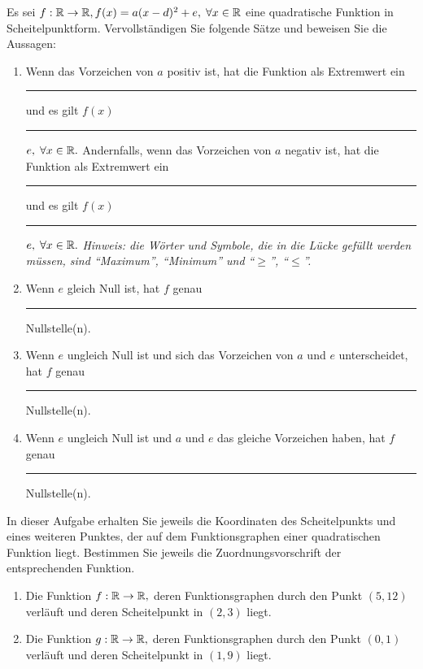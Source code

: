 \documentclass[12pt]{article}
\begin{document}
\begin{exercise}\label{ex:lueckentext_scheitelpunkt_uebungen}
Es sei $f: \mathbb{R} \rightarrow \mathbb{R}, f(x) = a(x-d)^2 + e, \; \forall x \in \mathbb{R}$ eine quadratische Funktion in Scheitelpunktform.
Vervollständigen Sie folgende Sätze und beweisen Sie die Aussagen:
\begin{enumerate}[label=\alph*)]
\item Wenn das Vorzeichen von $a$ positiv ist, hat die Funktion als Extremwert ein \rule{3cm}{0.5pt} und es gilt $f(x)$ \rule{0.5cm}{0.5pt} $e, \; \forall x \in \mathbb{R}.$ Andernfalls, wenn das Vorzeichen von $a$ negativ ist, hat die Funktion als Extremwert ein \rule{3cm}{0.5pt} und es gilt $f(x)$ \rule{0.5cm}{0.5pt} $e, \; \forall x \in \mathbb{R}.$ {\footnotesize \emph{Hinweis: die Wörter und Symbole, die in die Lücke gefüllt werden müssen, sind \emph{``Maximum'', ``Minimum''} und ``$\geqslant$'', ``$\leqslant$''.}}
\item Wenn $e$ gleich Null ist, hat $f$ genau \rule{1cm}{0.5pt} Nullstelle(n).

\item Wenn $e$ ungleich Null ist und sich das Vorzeichen von $a$ und $e$ unterscheidet, hat $f$ genau \rule{1cm}{0.5pt} Nullstelle(n).

\item Wenn $e$ ungleich Null ist und $a$ und $e$ das gleiche Vorzeichen haben, hat $f$ genau \rule{1cm}{0.5pt} Nullstelle(n).
\end{enumerate}
\end{exercise}


\begin{exercise}\label{ex:funktion_finden}
In dieser Aufgabe erhalten Sie jeweils die Koordinaten des Scheitelpunkts und eines weiteren Punktes, der auf dem Funktionsgraphen einer quadratischen Funktion liegt. Bestimmen Sie jeweils die Zuordnungsvorschrift der entsprechenden Funktion. \begin{enumerate}[label=\alph*)]
\item Die Funktion $f: \mathbb{R} \rightarrow \mathbb{R},$ deren Funktionsgraphen durch den Punkt $(5,12)$ verläuft und deren Scheitelpunkt in $(2,3)$ liegt.
\item Die Funktion $g: \mathbb{R} \rightarrow \mathbb{R},$  deren Funktionsgraphen durch den Punkt $(0,1)$ verläuft und deren Scheitelpunkt in $(1,9)$ liegt.
\end{enumerate}
\end{exercise}
\end{document}
